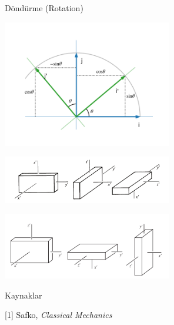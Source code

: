 \documentclass[12pt,fleqn]{article}\usepackage{../../common}
\begin{document}
Döndürme (Rotation)

\includegraphics[width=20em]{phy_072_rot_03.png}



\includegraphics[width=20em]{phy_072_rot_01.png}

\includegraphics[width=20em]{phy_072_rot_02.png}












Kaynaklar

[1] Safko, {\em Classical Mechanics}
\end{document}
